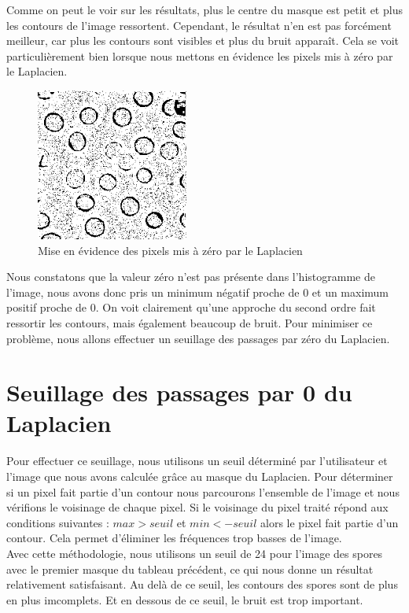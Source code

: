 \documentclass[a4paper,11pt]{article}
\begin{document}
  Comme on peut le voir sur les résultats, plus le centre du masque est petit et plus les contours de l'image ressortent. 
  Cependant, le résultat n'en est pas forcément meilleur, car plus les contours sont visibles et plus du bruit apparaît.
  Cela se voit particulièrement bien lorsque nous mettons en évidence les pixels mis à zéro par le Laplacien.
  
  \begin{figure}[H]
   \center
   \includegraphics[width=5cm]{../laplacien0.png}
   \caption{Mise en évidence des pixels mis à zéro par le Laplacien}
  \end{figure}

  Nous constatons que la valeur zéro n'est pas présente dans l'histogramme de l'image, nous avons donc pris 
  un minimum négatif proche de 0 et un maximum positif proche de 0.
  On voit clairement qu'une approche du second ordre fait ressortir les contours, mais également beaucoup de bruit. 
  Pour minimiser ce problème, nous allons effectuer un seuillage des passages par zéro du Laplacien.
  
  \section{Seuillage des passages par 0 du Laplacien}
  Pour effectuer ce seuillage, nous utilisons un seuil déterminé par l'utilisateur et l'image que nous avons
  calculée grâce au masque du Laplacien. Pour déterminer si un pixel fait partie d'un contour nous parcourons l'ensemble de l'image 
  et nous vérifions le voisinage de chaque pixel. Si le voisinage du pixel traité répond aux conditions suivantes : $max > seuil$ et $min < -seuil$
  alors le pixel fait partie d'un contour. Cela permet d'éliminer les fréquences trop basses de l'image.\\ 
  
  Avec cette méthodologie, nous utilisons un seuil de 24 pour l'image des spores avec le premier masque du tableau précédent, ce qui nous donne un résultat relativement
  satisfaisant. Au delà de ce seuil, les contours des spores sont de plus en plus imcomplets. Et en dessous de ce seuil, le bruit est
  trop important.
  
\end{document}
